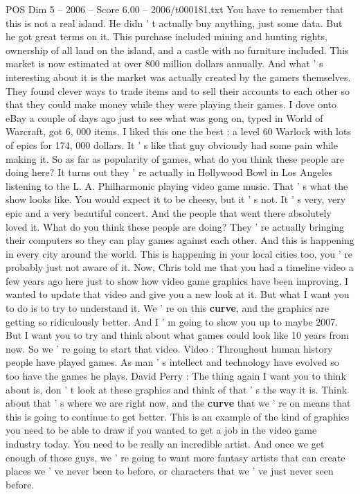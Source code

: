 \begin{textsample}{POS Dim 5 – 2006 – Score 6.00 – 2006/t000181.txt}
You have to remember that this is not a real island.
He didn ' t actually buy anything, just some data.
But he got great terms on it.
This purchase included mining and hunting rights, ownership of all land on the island, and a castle with no furniture included.
This market is now estimated at over 800 million dollars annually.
And what ' s interesting about it is the market was actually created by the gamers themselves.
They found clever ways to trade items and to sell their accounts to each other so that they could make money while they were playing their games.
I dove onto eBay a couple of days ago just to see what was gong on, typed in World of Warcraft, got 6, 000 items.
I liked this one the best : a level 60 Warlock with lots of epics for 174, 000 dollars.
It ' s like that guy obviously had some pain while making it.
So as far as popularity of games, what do you think these people are doing here?
It turns out they ' re actually in Hollywood Bowl in Los Angeles listening to the L.
A.
Philharmonic playing video game music.
That ' s what the show looks like.
You would expect it to be cheesy, but it ' s not.
It ' s very, very epic and a very beautiful concert.
And the people that went there absolutely loved it.
What do you think these people are doing?
They ' re actually bringing their computers so they can play games against each other.
And this is happening in every city around the world.
This is happening in your local cities too, you ' re probably just not aware of it.
Now, Chris told me that you had a timeline video a few years ago here just to show how video game graphics have been improving.
I wanted to update that video and give you a new look at it.
But what I want you to do is to try to understand it.
We ' re on this \textbf{curve}, and the graphics are getting so ridiculously better.
And I ' m going to show you up to maybe 2007.
But I want you to try and think about what games could look like 10 years from now.
So we ' re going to start that video.
Video : Throughout human history people have played games.
As man ' s intellect and technology have evolved so too have the games he plays.
David Perry : The thing again I want you to think about is, don ' t look at these graphics and think of that ' s the way it is.
Think about that ' s where we are right now, and the \textbf{curve} that we ' re on means that this is going to continue to get better.
This is an example of the kind of graphics you need to be able to draw if you wanted to get a job in the video game industry today.
You need to be really an incredible artist.
And once we get enough of those guys, we ' re going to want more fantasy artists that can create places we ' ve never been to before, or characters that we ' ve just never seen before.

\end{textsample}
